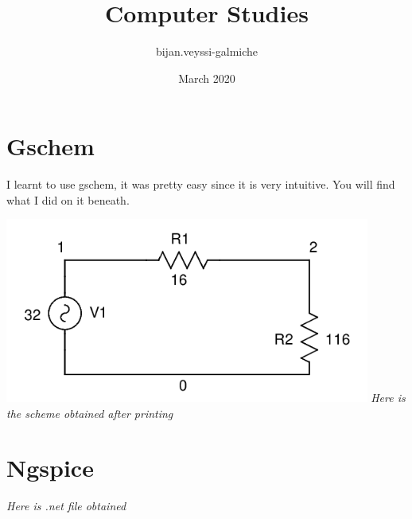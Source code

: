 \documentclass{article}
\title{Computer Studies}
\author{bijan.veyssi-galmiche }
\date{March 2020}
\begin{document}
\maketitle
\newpage
\section{Gschem}
I learnt to use gschem, it was pretty easy since it is very intuitive. You will find what I did on it beneath.
\newline
\begin{center}
\includegraphics[angle=0, width=12cm]{01.png}
\newline
\textit{Here is the scheme obtained after printing}
\end{center}{}
\section{Ngspice}

\textit{Here is .net file obtained}
\end{document}
